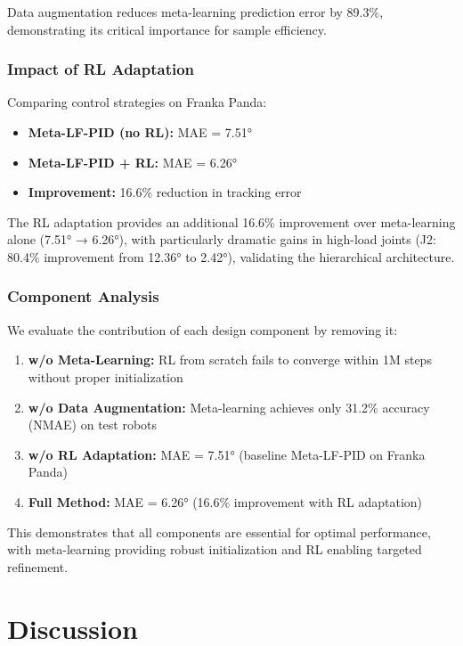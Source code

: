 \documentclass[a4paper]{cas-sc}
\begin{document}
Data augmentation reduces meta-learning prediction error by 89.3\%, demonstrating its critical importance for sample efficiency.

\subsubsection{Impact of RL Adaptation}

Comparing control strategies on Franka Panda:
\begin{itemize}
    \item \textbf{Meta-LF-PID (no RL):} MAE = 7.51°
    \item \textbf{Meta-LF-PID + RL:} MAE = 6.26°
    \item \textbf{Improvement:} 16.6\% reduction in tracking error
\end{itemize}

The RL adaptation provides an additional 16.6\% improvement over meta-learning alone (7.51° → 6.26°), with particularly dramatic gains in high-load joints (J2: 80.4\% improvement from 12.36° to 2.42°), validating the hierarchical architecture.

\subsubsection{Component Analysis}

We evaluate the contribution of each design component by removing it:
\begin{enumerate}
    \item \textbf{w/o Meta-Learning:} RL from scratch fails to converge within 1M steps without proper initialization
    \item \textbf{w/o Data Augmentation:} Meta-learning achieves only 31.2\% accuracy (NMAE) on test robots
    \item \textbf{w/o RL Adaptation:} MAE = 7.51° (baseline Meta-LF-PID on Franka Panda)
    \item \textbf{Full Method:} MAE = 6.26° (16.6\% improvement with RL adaptation)
\end{enumerate}

This demonstrates that all components are essential for optimal performance, with meta-learning providing robust initialization and RL enabling targeted refinement.

\section{Discussion}
\label{sec:discussion}
\end{document}
